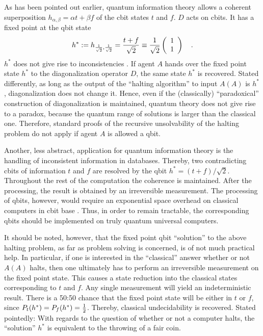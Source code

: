 As has been pointed out earlier,
quantum information theory allows a coherent superposition
$ h_{\alpha ,\beta}  =\alpha t+\beta f $
of the
cbit states $t$ and $f$.
$D$ acts on cbits. It
has a
fixed point at the qbit state
\begin{equation}
h^\ast :=h_{ {1\over \sqrt{2}},{1\over \sqrt{2}} }  ={t+f\over \sqrt{2}}
\equiv
{1\over \sqrt{2}} \left(
\begin{array}{c}
1 \\
1
 \end{array}
\right) \quad .
\end{equation}
$h^\ast$
does not give rise to inconsistencies \cite{svozil-paradox}.
If agent $A$ hands over the fixed point state
$h ^\ast $ to the diagonalization
operator $D$, the same state
$h^\ast $ is recovered.
Stated differently, as long as the output of the ``halting
algorithm'' to input $A(A)$ is $h^\ast$, diagonalization does not
change it. Hence, even if the (classically) ``paradoxical'' construction
of diagonalization is maintained, quantum theory does not give rise to a
paradox, because the quantum range of solutions is larger than the
classical one.
Therefore,
standard proofs of the recursive unsolvability of the halting problem
do not apply if agent $A$ is allowed a qbit.


Another, less abstract, application for quantum information theory is
the handling of inconsistent information in databases.
Thereby,
two contradicting cbits of information
$t$ and
$f $ are resolved by the qbit
$h^\ast =
{(t+f)/ \sqrt{2}}$.
Throughout the rest of the computation the coherence is maintained.
After the processing, the result is obtained by an irreversible
measurement. The processing of qbits, however, would require an
exponential
space overhead on classical computers in cbit base \cite{feynman}.
Thus, in order to remain tractable,
the corresponding qbits should be implemented on
truly quantum universal computers.



It should be noted, however, that the fixed point qbit ``solution''
to the above halting problem,
as far as problem solving is concerned, is of not much practical help.
In particular, if one is interested in the ``classical'' answer whether
or not $A(A)$ halts,  then one ultimately has to perform an
irreversible measurement
on the fixed point state. This  causes a state reduction into the
classical states corresponding to $t$ and $f$.
Any single measurement will yield an indeterministic result.
There is a 50:50 chance that
the fixed point state will be either in $t$ or $f$, since
$P_t(
h ^\ast)=
P_f(
h^\ast )= {1\over 2}$.
Thereby, classical undecidability is recovered.
Stated pointedly: With regards to the question of
whether or not a computer halts,
the ``solution'' $h^\ast$
is equivalent to the throwing of a fair coin.

